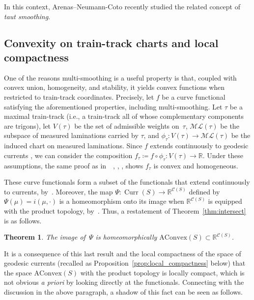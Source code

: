 \documentclass[11pt]{amsart}
\numberwithin{equation}{section}
\numberwithin{figure}{section}
\newtheorem{theorem}{Theorem}[section]
\theoremstyle{definition}
\theoremstyle{plain}
\newcommand\bbR{\ensuremath{\mathbb{R}}}
\DeclareMathOperator{\Curr}{Curr}
\newcommand{\AConvex}{\mathrm{AConvex}}
\newcommand{\Curves}{\mathcal{C}}
\newcommand{\ML}{\mathcal{ML}}
\begin{document}
In this context, Arenas--Neumann-Coto \cite{ANC24:TautSmoothings}
recently studied the related concept of \emph{taut smoothing}.

\subsection{Convexity on train-track charts and local compactness}
\label{sec:convexity_charts}

One of the reasons multi-smoothing is a useful property is that,
coupled with convex union, homogeneity, and stability, it
yields convex functions when restricted to train-track coordinates.
Precisely, let $f$ be a curve functional satisfying the aforementioned
properties, including multi-smoothing. Let $\tau$ be a maximal train-track (i.e., a
train-track all of whose complementary components are trigons), let
$V(\tau)$ be the set of admissible weights on~$\tau$, $\ML(\tau)$ be the subspace of
measured laminations carried by $\tau$, and
$\phi_{\tau} \colon V(\tau) \to \ML(\tau)$ be the induced
chart on measured laminations.
Since $f$ extends continuously to geodesic currents \cite[Theorem~A]{MGT21:Smoothings}, we can consider the composition $f_{\tau} \coloneqq f \circ \phi_{\tau} \colon V(\tau) \to \mathbb{R}$. Under these assumptions, the same proof as in~~\cite[Appendix~A]{Mir04:SimpleGeodesics}, \cite[Theorem~2]{Thu16:Research}, \cite[Theorem~4.7]{AH21:EffectiveCounting3}, shows $f_{\tau}$ is convex and homogeneous. 

These curve functionals form a subset of the functionals that extend
continuously to currents, by~\cite[Theorem~A]{MGT21:Smoothings}.
Moreover, the map $\Psi \colon \Curr(S) \to \mathbb{R}^{\Curves(S)}$
defined by $\Psi(\mu) = i(\mu, \cdot)$ is a homeomorphism onto its
image when $\mathbb{R}^{\Curves(S)}$ is equipped with the product
topology,
by~\cite[Theorem~11]{DLR10:DegenerationFlatMetrics}.
Thus, a restatement of Theorem~\ref{thm:intersect} is as follows.

\begin{theorem}
   The image of~$\Psi$ is homeomorphically $\AConvex(S) \subset \bbR^{\Curves(S)}$.
\end{theorem}

It is a consequence of this last result and the local compactness of
the space of geodesic currents (recalled as
Proposition~\ref{prop:local_compactness} below) that the space
$\AConvex(S)$ with the product topology is locally compact, which is
not obvious \textit{a priori} by looking directly at the functionals.
Connecting with the discussion in the above paragraph, a shadow of
this fact can be seen as follows.
\end{document}
